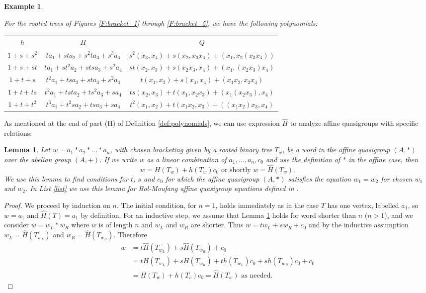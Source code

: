 \documentclass[11pt]{amsart}
\newtheorem{lemma}[theorem]{Lemma}
\newtheorem{example}[theorem]{Example}
\theoremstyle{definition}
\begin{document}
\begin{example}\label{E:fig1_5}
    

\noindent For the rooted trees of Figures \ref{F:bracket_1} through \ref{F:bracket_5}, we have the following polynomials: 

\begin{center}
{\small 
\begin{tabular}{c|c|c}
    $h$ & $H$ & $Q$ \\
    \hline
    $1 + s + s^2$ & $t a_1 + st a_2 + s^2t a_3 + s^3 a_4$ & $s^2(x_3, x_4) + s(x_2, x_3x_4) + (x_1,x_2(x_3x_4))$ \\
    $1 + s + st$ & $t a_1 + st^2 a_2 + sts a_3 + s^2 a_4$ & $st(x_2, x_3) + s(x_2x_3, x_4) + (x_1, (x_2x_3)x_4)$ \\
    $1 + t + s$ & $t^2 a_1 + ts a_2 + st a_3 + s^2 a_4$ & $t(x_1,x_2) + s(x_3,x_4) + (x_1x_2, x_3x_4)$ \\
    $1 + t + ts$ & $t^2 a_1 + tst a_2 + ts^2 a_3 + s a_4$ & $ts(x_2, x_3) + t(x_1, x_2x_3) + (x_1(x_2x_3), x_4)$ \\
    $1 + t + t^2$ & $t^3 a_1 + t^2s a_2 + ts a_3 + s a_4$ & $t^2(x_1, x_2) + t(x_1x_2, x_3) + ((x_1x_2)x_3, x_4)$
\end{tabular}}
\end{center}
\end{example}
As mentioned at the end of part (H) of Definition \ref{def:polynomials}, we can use expression $\hat H$ to analyze affine quasigroups with specific relations:
\begin{lemma}\label{lem:H}
Let $w=a_1*a_2*...*a_n$, with chosen bracketing given by a rooted binary tree $T_w$, be a word in the affine quasigroup $(A,*)$ over the abelian group
$(A,+)$. If we write $w$ as a linear combination of $a_1,...,a_n,c_0$ and use the definition of $*$ in the affine case, then
$$w= H(T_w)+h(T_w)c_0 \mbox{ or shortly } w=\hat H(T_w).$$
We use this lemma to find conditions for $t$, $s$ and $c_0$ for which the affine quasigroup $(A,*)$ satisfies the equation $w_1=w_2$ for chosen $w_1$ and $w_2$. In List \ref{list} we use this lemma for
Bol-Moufang affine quasigroup equations defined in \cite{PhVo1}.
\end{lemma}
\begin{proof}
We proceed by induction on $n$. The initial condition, for $n=1$, holds immediately as in the case $T$ has one vertex, labelled $a_1$, so $w=a_1$ and $\hat H(T)=a_1$ by definition.
For an inductive step, we assume that Lemma \ref{lem:H} holds for word shorter than $n$ ($n>1$), and we consider $w=w_L*w_R$ where $w$ is of length $n$ and $w_L$ and $w_R$ are shorter. 
Thus $w=tw_L+sw_R +c_0$ and by the inductive assumption $w_L=\hat H(T_{w_L})$ and $w_R= \hat H(T_{w_R})$. Therefore
\begin{align*}
    w & = t\hat H(T_{w_L})+s\hat H(T_{w_R})+ c_0 \\
    & = tH(T_{w_L})+sH(T_{w_R}) + th(T_{w_L})c_0+sh(T_{w_R})c_0 +c_0 \\
    & = H(T_w) +h(T_v)c_0= \hat H(T_w) \mbox{ as needed.}
\end{align*}
\end{proof}
\end{document}
